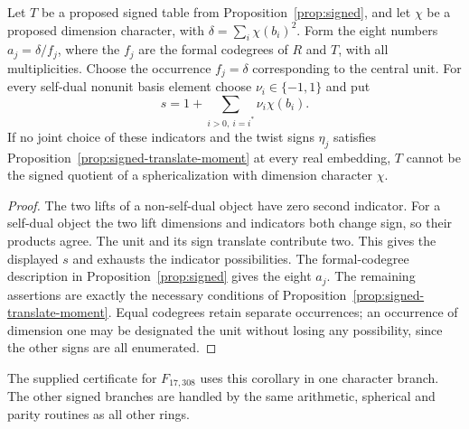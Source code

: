 \begin{corollary}\label{cor:sign-certificate}
Let $T$ be a proposed signed table from Proposition~\ref{prop:signed}, and
let $\chi$ be a proposed dimension character, with
$\delta=\sum_i\chi(b_i)^2$. Form the eight numbers $a_j=\delta/f_j$,
where the $f_j$ are the formal codegrees of $R$ and $T$, with all
multiplicities. Choose the occurrence $f_j=\delta$ corresponding to the
central unit. For every self-dual nonunit basis element choose
$\nu_i\in\{-1,1\}$ and put
\[
 s=1+\sum_{i>0,\ i=i^*}\nu_i\chi(b_i).
\]
If no joint choice of these indicators and the twist signs $\eta_j$
satisfies Proposition~\ref{prop:signed-translate-moment} at every real
embedding, $T$ cannot be the signed quotient of a sphericalization with
dimension character $\chi$.
\end{corollary}
\begin{proof}
The two lifts of a non-self-dual object have zero second indicator.
For a self-dual object the two lift dimensions and indicators both change
sign, so their products agree. The unit and its sign translate contribute
two. This gives the displayed $s$ and exhausts the indicator possibilities.
The formal-codegree description in Proposition~\ref{prop:signed} gives the
eight $a_j$. The remaining assertions are exactly the necessary conditions
of Proposition~\ref{prop:signed-translate-moment}. Equal codegrees retain
separate occurrences; an occurrence of dimension one may be designated the
unit without losing any possibility, since the other signs are all enumerated.
\end{proof}

The supplied certificate for $F_{17,308}$ uses this corollary in one
character branch. The other signed branches are handled by the same
arithmetic, spherical and parity routines as all other rings.
